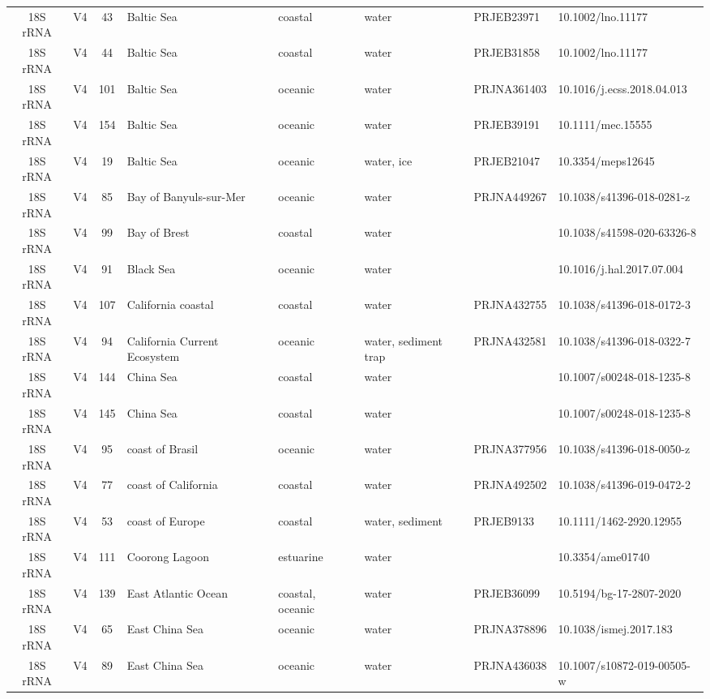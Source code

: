 \begin{longtable}{ccclllll}
  18S rRNA & V4 & 43 & Baltic Sea & coastal & water & PRJEB23971 & 10.1002/lno.11177 \\ 
  18S rRNA & V4 & 44 & Baltic Sea & coastal & water & PRJEB31858 & 10.1002/lno.11177 \\ 
  18S rRNA & V4 & 101 & Baltic Sea & oceanic & water & PRJNA361403 & 10.1016/j.ecss.2018.04.013 \\ 
  18S rRNA & V4 & 154 & Baltic Sea & oceanic & water & PRJEB39191 & 10.1111/mec.15555 \\ 
  18S rRNA & V4 & 19 & Baltic Sea & oceanic & water, ice & PRJEB21047 & 10.3354/meps12645 \\ 
  18S rRNA & V4 & 85 & Bay of Banyuls-sur-Mer & oceanic & water & PRJNA449267 & 10.1038/s41396-018-0281-z \\ 
  18S rRNA & V4 & 99 & Bay of Brest & coastal & water &  & 10.1038/s41598-020-63326-8 \\ 
  18S rRNA & V4 & 91 & Black Sea & oceanic & water &  & 10.1016/j.hal.2017.07.004 \\ 
  18S rRNA & V4 & 107 & California coastal & coastal & water & PRJNA432755 & 10.1038/s41396-018-0172-3 \\ 
  18S rRNA & V4 & 94 & California Current Ecosystem & oceanic & water, sediment trap & PRJNA432581 & 10.1038/s41396-018-0322-7 \\ 
  18S rRNA & V4 & 144 & China Sea & coastal & water &  & 10.1007/s00248-018-1235-8 \\ 
  18S rRNA & V4 & 145 & China Sea & coastal & water &  & 10.1007/s00248-018-1235-8 \\ 
  18S rRNA & V4 & 95 & coast of Brasil & oceanic & water & PRJNA377956 & 10.1038/s41396-018-0050-z \\ 
  18S rRNA & V4 & 77 & coast of California & coastal & water & PRJNA492502 & 10.1038/s41396-019-0472-2 \\ 
  18S rRNA & V4 & 53 & coast of Europe & coastal & water, sediment & PRJEB9133 & 10.1111/1462-2920.12955 \\ 
  18S rRNA & V4 & 111 & Coorong Lagoon & estuarine & water &  & 10.3354/ame01740 \\ 
  18S rRNA & V4 & 139 & East Atlantic Ocean & coastal, oceanic & water & PRJEB36099 & 10.5194/bg-17-2807-2020 \\ 
  18S rRNA & V4 & 65 & East China Sea & oceanic & water & PRJNA378896 & 10.1038/ismej.2017.183 \\ 
  18S rRNA & V4 & 89 & East China Sea & oceanic & water & PRJNA436038 & 10.1007/s10872-019-00505-w \\ 

\end{longtable}
